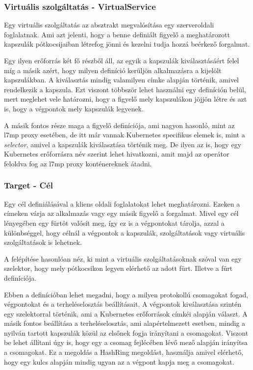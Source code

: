 \subsubsection{Virtuális szolgáltatás - VirtualService}

Egy virtuális szolgáltatás az absztrakt megvalósítása egy szerveroldali foglalatnak. 
Ami azt jelenti, hogy a benne definiált figyelő a meghatározott kapszulák pótkocsijaiban 
létrefog jönni és kezelni tudja hozzá beérkező forgalmat. 

Egy ilyen erőforrás két fő részből áll, az egyik a kapszulák kiválasztásáért felel míg
a másik azért, hogy milyen definíció kerüljön alkalmazásra a kijelölt kapszulákban.
A kiválasztás mindig valamilyen címke alapján történik, amivel rendelkezik a kapszula. 
Ezt viszont többször lehet használni egy definíción belül, mert meglehet vele határozni,
hogy a figyelő mely kapszulákon jöjjön létre és azt is, hogy a végpontok mely kapszulák 
legyenek. 

A másik fontos része maga a figyelő definíciója, ami nagyon hasonló, mint az l7mp proxy
esetében, de itt már vannak Kubernetes specifikus elemek is, mint a \textit{selector},
amivel a kapszulák kiválasztása történik meg. De ilyen az is, hogy egy Kubernetes 
erőforrásra név szerint lehet hivatkozni, amit majd az operátor feloldva fog az l7mp
proxy konténereknek átadni.

\subsubsection{Target - Cél}

Egy cél definiálásával a kliens oldali foglalatokat lehet meghatározni. Ezeken 
a címeken várja az alkalmazás vagy egy másik figyelő a forgalmat. Mivel egy cél 
lényegében egy fürtöt valósít meg, így ez is a végpontokat tárolja, azzal a különbséggel,
hogy célnál a végpontok a kapszulák, szolgáltatások vagy virtuális szolgáltatások is 
lehetnek. 

A felépítése hasonlóan néz, ki mint a virtuális szolgáltatásoknak szóval van egy 
szelektor, hogy mely pótkocsikon legyen elérhető az adott fürt. Illetve a fürt
definíciója. 

Ebben a definícióban lehet megadni, hogy a milyen protokollú csomagokat fogad, végpontokat
és a terheléselosztás beállításait. A végpontok kiválasztása szintén egy szelektorral
történik, ami a Kubernetes erőforrások címkéi alapján választ. A másik fontos beállítása
a terheléselosztás, ami alapértelmezett esetben, mindig a nyilván tartott kapszulák 
közül az elsőnek fogja irányítani a csomagokat. Viszont be lehet állítani úgy is, hogy
egy a csomag fejlécében lévő mező alapján irányítsa a csomagokat. Ez a megoldás a
HashRing megoldást, használja amivel elérhető, hogy egy kulcs alapján mindig ugyan az
a végpont kapja meg a csomagokat. 

